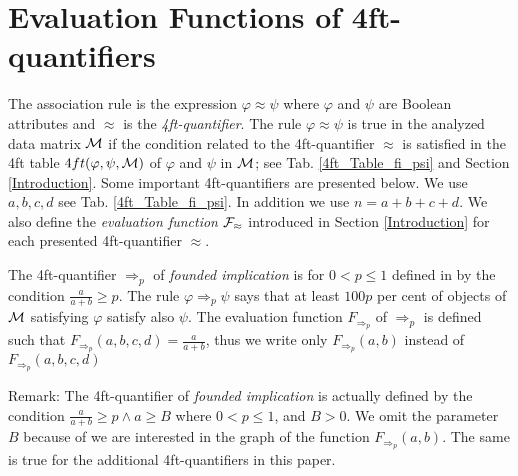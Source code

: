 \section{Evaluation Functions of 4ft-quantifiers} \label{Evaluation_Functions}

The association rule is the expression $\varphi \approx \psi$ where
$\varphi $ and $ \psi $  are Boolean attributes and $ \approx $ 
is the {\it 4ft-quantifier}. The rule $\varphi \approx \psi$ is true in the 
analyzed data matrix $\cal M$ if the condition related to the 4ft-quantifier
$ \approx $  is satisfied in the 4ft table $4ft(\varphi, \psi, {\cal M})$ of $\varphi $
and $\psi$ in $\cal M$; see Tab. \ref{4ft_Table_fi_psi} and Section 
\ref{Introduction}. 
Some important 4ft-quantifiers are presented below. 
We use $ a, b, c, d $ see Tab.  \ref{4ft_Table_fi_psi}.
In addition we use %
$ n = a + b+ c + d$. We also define the 
 {\em evaluation function} ${\cal F}_{\approx}$  introduced in Section \ref{Introduction}
 for each presented 4ft-quantifier $\approx$. 



The 4ft-quantifier $ \Rightarrow_{p} $ of {\it founded
implication \/} is for $ 0 < p \leq 1 $  defined in \cite{Ha:78} 
by the condition
$ \frac{a}{a+b} \geq p $. 
The rule $\varphi \Rightarrow_{p}  \psi $ says that at 
least $100p$ per cent of objects of ${\cal M }$ satisfying 
$\varphi $ satisfy also $\psi$. The evaluation function $ F_{\Rightarrow_{p}}$
of $\Rightarrow_{p}$ is defined such that 
$ F_{\Rightarrow_{p}}(a,b,c,d) = \frac{a}{a+b} $, thus we write only 
$ F_{\Rightarrow_{p}}(a,b)$ instead of $ F_{\Rightarrow_{p}}(a,b,c,d)$

Remark: The 4ft-quantifier  of {\it founded implication \/} is actually 
defined by the condition $ \frac{a}{a+b} \geq p \land a \geq B $  where 
$ 0 < p \leq 1 $, and $ B > 0$. We omit the parameter $B$ because of we are 
interested in the graph of the function $ F_{\Rightarrow_{p}}(a,b)$. 
The same is  true for the additional 4ft-quantifiers  in this paper. 
 

